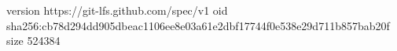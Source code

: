 version https://git-lfs.github.com/spec/v1
oid sha256:cb78d294dd905dbeac1106ee8e03a61e2dbf17744f0e538e29d711b857bab20f
size 524384
